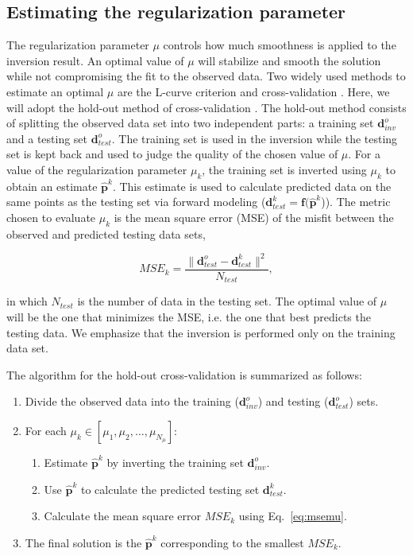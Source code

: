 \documentclass[extra]{gji}
\begin{document}
\subsection{Estimating the regularization parameter}

The regularization parameter $\mu$ controls how much smoothness is applied to
the inversion result.
An optimal value of $\mu$ will stabilize and smooth the solution while not
compromising the fit to the observed data.
Two widely used methods to estimate an optimal $\mu$ are
the L-curve criterion and cross-validation \citep{hansen1992}.
Here, we will adopt the hold-out method of cross-validation \citep{kim2009}.
The hold-out method consists of splitting the observed data set into two
independent parts:
a training set $\mathbf{d}^o_{inv}$
and a testing set $\mathbf{d}^o_{test}$.
The training set is used in the inversion
while the testing set is kept back
and used to judge the quality of the chosen value of $\mu$.
For a value of the regularization parameter $\mu_k$,
the training set is inverted using $\mu_k$
to obtain an estimate $\mathbf{\hat{p}}^k$.
This estimate is used to calculate predicted data
on the same points as the testing set
via forward modeling
($\mathbf{d}_{test}^k = \mathbf{f}(\mathbf{\hat{p}}^k$)).
The metric chosen to evaluate $\mu_k$ is
the mean square error (MSE) of the misfit
between the observed and predicted testing data sets,

\begin{equation}
    MSE_k = \dfrac{\|\mathbf{d}^o_{test} - \mathbf{d}^k_{test}\|^2}{N_{test}},
    \label{eq:msemu}
\end{equation}

\noindent
in which $N_{test}$ is the number of data in the testing set.
The optimal value of $\mu$ will be the one that minimizes the MSE,
i.e. the one that best predicts the testing data.
We emphasize that the inversion is performed only on the training data set.

The algorithm for the hold-out cross-validation is summarized as follows:

\begin{enumerate}
    \item Divide the observed data into
        the training ($\mathbf{d}^o_{inv}$)
        and testing ($\mathbf{d}^o_{test}$) sets.
    \item For each $\mu_k \in [\mu_1, \mu_2, \ldots, \mu_{N_{\mu}}]$:
    \begin{enumerate}
        \item Estimate $\mathbf{\hat{p}}^k$ by inverting the training set
            $\mathbf{d}^o_{inv}$.
        \item Use $\mathbf{\hat{p}}^k$ to calculate the predicted testing set
            $\mathbf{d}^k_{test}$.
        \item Calculate the mean square error $MSE_k$ using Eq.~\ref{eq:msemu}.
    \end{enumerate}
    \item The final solution is the $\mathbf{\hat{p}}^k$ corresponding to the
        smallest $MSE_k$.
\end{enumerate}
\end{document}
